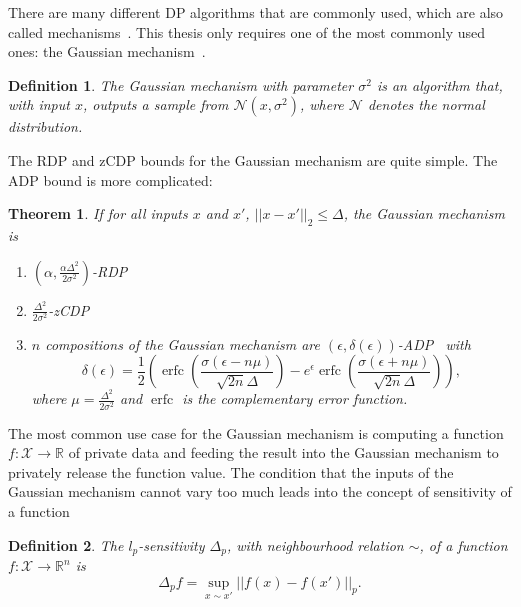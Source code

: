 \documentclass[english,twoside,openright]{HYgraduMLDS}
\newtheorem{theorem}{Theorem}
\newtheorem{definition}{Definition}
\newcommand{\R}{\mathbb{R}}
\newcommand{\calx}{{\mathcal{X}}}
\newcommand{\caln}{{\mathcal{N}}}
\DeclareMathOperator{\erfc}{erfc}
\begin{document}
There are many different DP algorithms that are commonly used, which are also
called mechanisms~\cite{DwR14}. This thesis only requires one of the most commonly 
used ones: the Gaussian mechanism~\cite{DwR14}.
\begin{definition}
    The Gaussian mechanism with parameter \(\sigma^2\) 
    is an algorithm that, with input \(x\), 
    outputs a sample from \(\caln(x, \sigma^2)\), where \(\caln\) denotes 
    the normal distribution.
\end{definition}

The RDP and zCDP bounds for the Gaussian 
mechanism are quite simple. The ADP bound is more complicated:

\begin{theorem}\label{gauss-DP-bounds}
    If for all inputs \(x\) and \(x'\), \(||x - x'||_2 \leq \Delta\),
    the Gaussian mechanism is 
    \begin{enumerate}
        \item 
            \((\alpha, \frac{\alpha \Delta^2}{2\sigma^2})\)-RDP~\cite{Mironov17}
        \item 
            \(\frac{\Delta^2}{2\sigma^2}\)-zCDP~\cite{BuS16}
        \item 
            \(n\) compositions of the Gaussian mechanism are 
            \((\epsilon, \delta(\epsilon))\)-ADP~\cite{Sommer2019} with 
            \[
                \delta(\epsilon) 
                = \frac{1}{2}\left(
                    \erfc\left(\frac{\sigma(\epsilon - n\mu)}{\sqrt{2n}\Delta}\right)
                    - e^\epsilon \erfc\left(\frac{\sigma(\epsilon + n\mu)}{\sqrt{2n}\Delta}\right)
                \right),
            \]
            where \(\mu = \frac{\Delta^2}{2\sigma^2}\) and \(\erfc\) is 
            the complementary error function.
    \end{enumerate}
\end{theorem}

The most common use case for the Gaussian mechanism is computing a
function \(f\colon \calx \to \R\) of private data and feeding the result into 
the Gaussian mechanism to privately release the function value. 
The condition that the inputs 
of the Gaussian mechanism cannot vary too much leads into the concept of 
sensitivity of a function
\begin{definition}
    The \(l_p\)-sensitivity \(\Delta_p\), with neighbourhood relation \(\sim\),
    of a function \(f\colon \calx \to \R^n\)
    is 
    \[
        \Delta_p f = \sup_{x\sim x'}||f(x) - f(x')||_p.
    \]
\end{definition}
\end{document}
